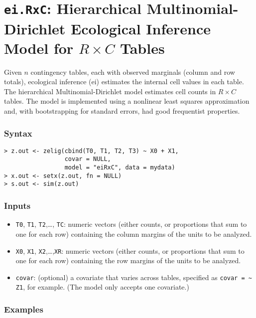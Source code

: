 \section{\texttt{ei.RxC}: Hierarchical Multinomial-Dirichlet Ecological
  Inference Model for $R \times C$ Tables}
\label{eiRxC}

Given $n$ contingency tables, each with observed marginals (column and
row totals), ecological inference ({\sc ei}) estimates the internal
cell values in each table.  The hierarchical Multinomial-Dirichlet
model estimates cell counts in $R \times C$ tables. The model is
implemented using a nonlinear least squares approximation and, with
bootstrapping for standard errors, had good frequentist properties.

\subsubsection{Syntax}
\begin{verbatim}
> z.out <- zelig(cbind(T0, T1, T2, T3) ~ X0 + X1, 
                 covar = NULL, 
                 model = "eiRxC", data = mydata)
> x.out <- setx(z.out, fn = NULL)
> s.out <- sim(z.out)
\end{verbatim}

\subsubsection{Inputs}

\begin{itemize}
\item \texttt{T0}, \texttt{T1}, \texttt{T2},\ldots, \texttt{TC}:
  numeric vectors (either counts, or proportions that sum to one for
  each row) containing the column margins of the units to be analyzed.

\item \texttt{X0}, {\tt X1}, {\tt X2},\ldots,{\tt XR}: numeric vectors
  (either counts, or proportions that sum to one for each row)
  containing the row margins of the units to be analyzed.

\item {\tt covar}: (optional) a covariate that varies across tables,
specified as \verb|covar = ~ Z1|, for example.  (The model only
accepts one covariate.)
\end{itemize}

\subsubsection{Examples}

